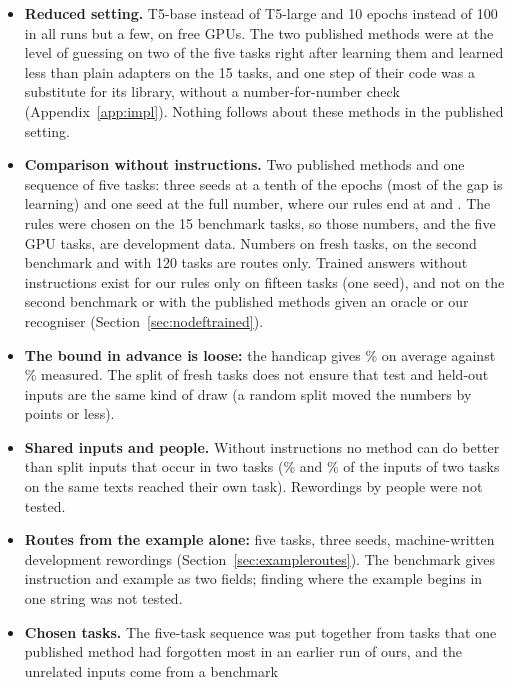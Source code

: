 \begin{itemize}
  \item \textbf{Reduced setting.} T5-base instead of T5-large and 10 epochs instead of 100 in all runs
  but a few, on free GPUs. The two published methods were at the level of guessing on two of the five
  tasks right after learning them and learned less than plain adapters on the 15 tasks, and one step of
  their code was a substitute for its library, without a number-for-number check
  (Appendix~\ref{app:impl}). Nothing follows about these methods in the published setting.
  \item \textbf{Comparison without instructions.} Two published methods and one sequence of five tasks:
  three seeds at a tenth of the epochs (most of the gap is learning) and one seed at the full number,
  where our rules end at \AudFullOursRidgeAPOne{} and \AudFullOursHandicapAPOne{}. The rules were
  chosen on the 15 benchmark tasks, so those numbers, and the five GPU tasks, are development data.
  Numbers on fresh tasks, on the second benchmark and with 120 tasks are routes only. Trained answers without instructions exist
  for our rules only on fifteen tasks (one seed), and not on the second benchmark or with the published
  methods given an oracle or our recogniser (Section~\ref{sec:nodeftrained}).
  \item \textbf{The bound in advance is loose:} the handicap gives \AudDevHPrimeTTwoBound{}\% on average
  against \AudDevHPrimeTTwoChanged{}\% measured. The split of fresh tasks does not ensure that test and
  held-out inputs are the same kind of draw (a random split moved the numbers by
  \AudScaleSplitMaxDiffEnd{} points or less).
  \item \textbf{Shared inputs and people.} Without instructions no method can do better than split
  inputs that occur in two tasks (\AudScalePairOlderLEnd{}\% and \AudScalePairNewerLEnd{}\% of the
  inputs of two tasks on the same texts reached their own task). Rewordings by people were not tested.
  \item \textbf{Routes from the example alone:} five tasks, three seeds, machine-written development
  rewordings (Section~\ref{sec:exampleroutes}). The benchmark gives instruction and example as two
  fields; finding where the example begins in one string was not tested.
  \item \textbf{Chosen tasks.} The five-task sequence was put together from tasks that one published
  method had forgotten most in an earlier run of ours, and the unrelated inputs come from a benchmark

\end{itemize}
